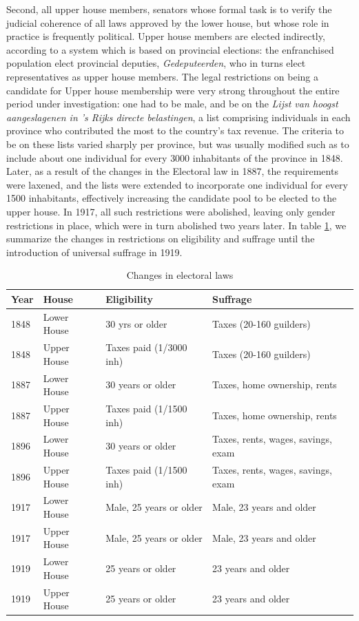     Second, all upper house members, senators whose formal task is to verify the judicial coherence of all laws approved by the lower house, but whose role in practice is frequently political.\autocite{van1999eerste} Upper house members are elected indirectly, according to a system which is based on provincial elections: the enfranchised population elect provincial deputies, \textit{Gedeputeerden}, who in turns elect representatives as upper house members. The legal restrictions on being a candidate for Upper house membership were very strong throughout the entire period under investigation: one had to be male, and be on the \textit{Lijst van hoogst aangeslagenen in 's Rijks directe belastingen}, a list comprising individuals in each province who contributed the most to the country's tax revenue. \autocite{moes1994lijsten} The criteria to be on these lists varied sharply per province, but was usually modified such as to include about one individual for every 3000 inhabitants of the province in 1848. \autocite{moes2012onder} Later, as a result of the changes in the Electoral law in 1887, the requirements were laxened, and the lists were extended to incorporate one individual for every 1500 inhabitants, effectively increasing the candidate pool to be elected to the upper house. In 1917, all such restrictions were abolished, leaving only gender restrictions in place, which were in turn abolished two years later. In table \ref{tab:upperhouselowerhouse}, we summarize the changes in restrictions on eligibility and suffrage until the introduction of universal suffrage in 1919. 

\begin{table}[!ht]
    \footnotesize
    \centering
    \begin{tabular}{llll}
        Year & House & Eligibility & Suffrage  \\ \hline
        1848 & Lower House & 30 yrs or older & Taxes (20-160 guilders) \\
        1848 & Upper House & Taxes paid (1/3000 inh) & Taxes (20-160 guilders) \\
        1887 & Lower House & 30 years or older & Taxes, home ownership, rents \\
        1887 & Upper House & Taxes paid (1/1500 inh) & Taxes, home ownership, rents \\
        1896 & Lower House & 30 years or older & Taxes, rents, wages, savings, exam \\
        1896 & Upper House & Taxes paid (1/1500 inh) & Taxes, rents, wages, savings, exam \\
        1917 & Lower House & Male, 25 years or older & Male, 23 years and older \\
        1917 & Upper House & Male, 25 years or older  & Male, 23 years and older \\
        1919 & Lower House & 25 years or older & 23 years and older \\
        1919 & Upper House & 25 years or older & 23 years and older \\ \hline
    \end{tabular}
    \caption{Changes in electoral laws}
    \label{tab:upperhouselowerhouse}
\end{table}

